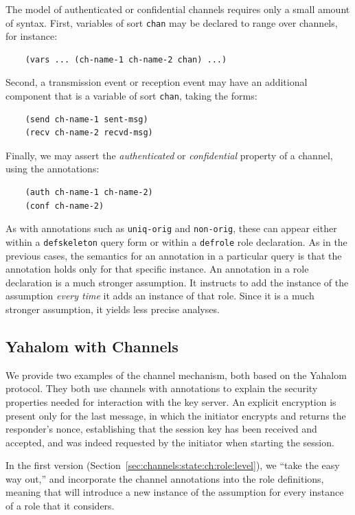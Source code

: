 The {\cpsa} model of authenticated or confidential channels requires
only a small amount of syntax.  First, variables of sort \verb|chan|
may be declared to range over channels, for instance:
%
\begin{verbatim}
    (vars ... (ch-name-1 ch-name-2 chan) ...)
\end{verbatim}
%
Second, a transmission event or reception event may have an additional
component that is a variable of sort \verb|chan|, taking the forms:
%
\begin{verbatim}
    (send ch-name-1 sent-msg)
    (recv ch-name-2 recvd-msg)
\end{verbatim}
%
Finally, we may assert the \emph{authenticated} or \emph{confidential}
property of a channel, using the annotations:
%
\begin{verbatim}
    (auth ch-name-1 ch-name-2)
    (conf ch-name-2)
\end{verbatim}
%
As with annotations such as \verb|uniq-orig| and \verb|non-orig|,
these can appear either within a \verb|defskeleton| query form or
within a \verb|defrole| role declaration.  As in the previous cases,
the semantics for an annotation in a particular query is that the
annotation holds only for that specific instance.  An annotation in a
role declaration is a much stronger assumption.  It instructs {\cpsa}
to add the instance of the assumption \emph{every time} it adds an
instance of that role.  Since it is a much stronger assumption, it
yields less precise analyses.

\subsection{Yahalom with Channels}
\label{sec:channels:state:ch:yahalom}

We provide two examples of the channel mechanism, both based on the
Yahalom protocol.  They both use channels with annotations to explain
the security properties needed for interaction with the key server.
An explicit encryption is present only for the last message, in which
the initiator encrypts and returns the responder's nonce, establishing
that the session key has been received and accepted, and was indeed
requested by the initiator when starting the session.

In the first version (Section~\ref{sec:channels:state:ch:role:level}),
we ``take the easy way out,'' and incorporate the channel annotations
into the role definitions, meaning that {\cpsa} will introduce a new
instance of the assumption for every instance of a role that it
considers.

